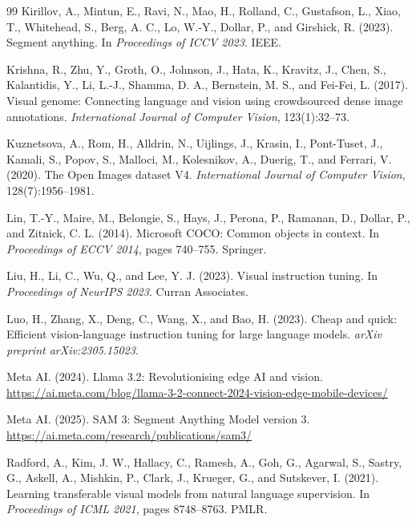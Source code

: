 \documentclass[12pt,a4paper]{article}
\begin{document}
\begin{thebibliography}{99}
Kirillov, A., Mintun, E., Ravi, N., Mao, H., Rolland, C., Gustafson, L., Xiao, T.,
Whitehead, S., Berg, A. C., Lo, W.-Y., Dollar, P., and Girshick, R. (2023).
Segment anything.
In \emph{Proceedings of ICCV 2023}. IEEE.

Krishna, R., Zhu, Y., Groth, O., Johnson, J., Hata, K., Kravitz, J., Chen, S.,
Kalantidis, Y., Li, L.-J., Shamma, D. A., Bernstein, M. S., and Fei-Fei, L. (2017).
Visual genome: Connecting language and vision using crowdsourced dense image annotations.
\emph{International Journal of Computer Vision}, 123(1):32--73.

Kuznetsova, A., Rom, H., Alldrin, N., Uijlings, J., Krasin, I., Pont-Tuset, J.,
Kamali, S., Popov, S., Malloci, M., Kolesnikov, A., Duerig, T., and Ferrari, V. (2020).
The Open Images dataset V4.
\emph{International Journal of Computer Vision}, 128(7):1956--1981.

Lin, T.-Y., Maire, M., Belongie, S., Hays, J., Perona, P., Ramanan, D., Dollar, P.,
and Zitnick, C. L. (2014).
Microsoft COCO: Common objects in context.
In \emph{Proceedings of ECCV 2014}, pages 740--755. Springer.

Liu, H., Li, C., Wu, Q., and Lee, Y. J. (2023).
Visual instruction tuning.
In \emph{Proceedings of NeurIPS 2023}. Curran Associates.

Luo, H., Zhang, X., Deng, C., Wang, X., and Bao, H. (2023).
Cheap and quick: Efficient vision-language instruction tuning for large language models.
\emph{arXiv preprint arXiv:2305.15023}.

Meta AI. (2024).
Llama 3.2: Revolutionising edge AI and vision.
\url{https://ai.meta.com/blog/llama-3-2-connect-2024-vision-edge-mobile-devices/}

Meta AI. (2025).
SAM 3: Segment Anything Model version 3.
\url{https://ai.meta.com/research/publications/sam3/}

Radford, A., Kim, J. W., Hallacy, C., Ramesh, A., Goh, G., Agarwal, S., Sastry, G.,
Askell, A., Mishkin, P., Clark, J., Krueger, G., and Sutskever, I. (2021).
Learning transferable visual models from natural language supervision.
In \emph{Proceedings of ICML 2021}, pages 8748--8763. PMLR.


\end{thebibliography}
\end{document}
